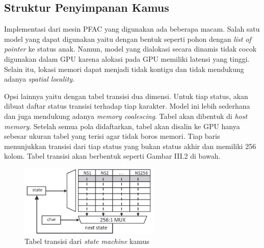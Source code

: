      
      
      \subsection{Struktur Penyimpanan Kamus}
      
      Implementasi dari mesin PFAC yang digunakan ada beberapa macam. Salah satu model yang dapat digunakan yaitu dengan bentuk seperti pohon dengan \emph{list of pointer} ke status anak. Namun, model yang dialokasi secara dinamis tidak cocok digunakan dalam GPU karena alokasi pada GPU memiliki latensi yang tinggi. Selain itu, lokasi memori dapat menjadi tidak kontigu dan tidak mendukung adanya \emph{spatial locality}.
      
      Opsi lainnya yaitu dengan tabel transisi dua dimensi. Untuk tiap status, akan dibuat daftar status transisi terhadap tiap karakter. Model ini lebih sederhana dan juga mendukung adanya \emph{memory coalescing}. Tabel akan dibentuk di \emph{host memory}. Setelah semua pola didaftarkan, tabel akan disalin ke GPU hanya sebesar ukuran tabel yang terisi agar tidak boros memori. Tiap baris menunjukkan transisi dari tiap status yang bukan status akhir dan memiliki 256 kolom. Tabel transisi akan berbentuk seperti Gambar III.2 di bawah.

      \begin{figure}[htb]
        \centering
        \includegraphics[width=0.6\textwidth]{resources/table.png}
        \caption[Tabel transisi]{Tabel transisi dari \emph{state machine} kamus}
      \end{figure}


